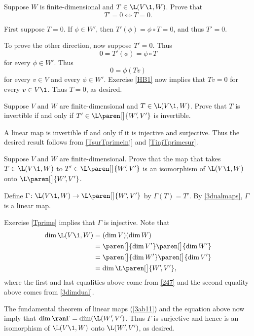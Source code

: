 \exercise
Suppose $W$ is finite-dimensional and $T \in \L(V\1, W)$. Prove that \label{Tprime}
\[
T' = 0 \iff T = 0.
\]
\exercisedisplayend

\begin{Solution}
First suppose $T = 0$. If $\phi \in W'\!$, then $T' \! (\phi) = \phi \circ T = 0$, and thus $T' = 0$.

To prove the other direction, now suppose $T' = 0$. Thus
\[
0 = T' \! (\phi) = \phi \circ T
\]
for every $\phi \in W'\!$. Thus
\[
0 = \phi(Tv)
\]
for every $v \in V$ and every $\phi \in W'\!$. Exercise \ref{HB1} now implies that $Tv = 0$ for every $v \in V\1$. Thus $T = 0$, as desired.
\end{Solution}

\exercise
Suppose $V$ and $W$ are finite-dimensional and $T \in \L(V\1, W)$. Prove that $T$ is invertible if and only if
$T' \in \L\paren[\big]{W'\!, V'}$ is invertible.

\begin{Solution}
A linear map is invertible if and only if it is injective and surjective. Thus the desired result follows from \ref{TsurTprimeinj} and \ref{TinjTprimesur}.
\end{Solution}

\exercise
Suppose $V$ and $W$ are finite-dimensional. Prove that the map that takes $T \in \L(V\1,W)$ to $T' \in \L\paren[\big]{W'\!, V'}$ is an isomorphism of $\L(V\1,W)$ onto $\L\paren[\big]{W'\!, V'}$.

\begin{Solution}
Define $\Gamma \colon \L(V\1,W) \to \L\paren[\big]{W'\!, V'}$ by $\Gamma(T) = T'\!$. By \ref{3dualmaps}, $\Gamma$ is a linear map.

Exercise \ref{Tprime} implies that $\Gamma$ is injective. Note that
\begin{align*}
\dim \L(V\1, W) &= (\dim V)(\dim W) \\
&= \paren[\big]{\dim V'} \paren[\big]{\dim W'} \\
&= \paren[\big]{\dim W'} \paren[\big]{\dim V'} \\
&= \dim \L\paren[\big]{W'\!, V'},
\end{align*}
where the first and last equalities above come from \ref{247}
and the second equality above comes from \ref{3dimdual}.

The fundamental theorem of linear maps (\ref{3ab11}) and the equation above now imply that $\dim \ran \Gamma = \dim (\L(W'\!, V')$. Thus $\Gamma$ is surjective and hence is an isomorphism of $\L(V\1,W)$ onto $\L(W'\!, V')$, as desired.
\end{Solution}

